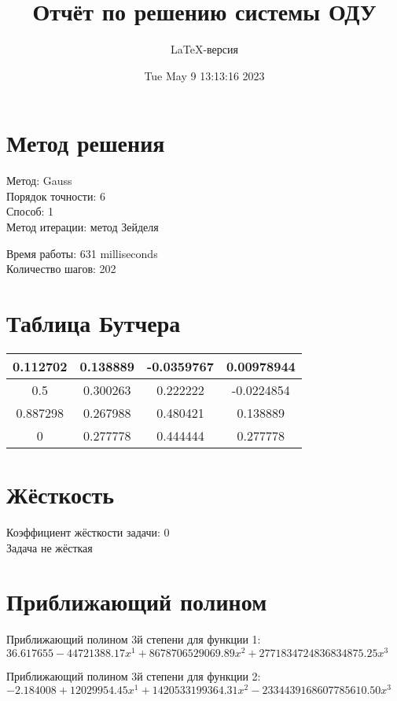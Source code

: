 \documentclass[a4paper,14pt]{extarticle}
\title{Отчёт по решению системы ОДУ}
\author{LaTeX-версия}
\date{Tue May  9 13:13:16 2023}
\begin{document}
\maketitle

\tableofcontents
\pagebreak

\section{Метод решения}

Метод: Gauss\\
Порядок точности: 6\\
Способ: 1\\
Метод итерации: метод Зейделя

Время работы: 631 milliseconds\\
Количество шагов: 202\\
\section{Таблица Бутчера}

\begin{table}[h]
\centering
\begin{tabular}{|c||c|c|c|}
\hline
0.112702 & 0.138889 & -0.0359767 & 0.00978944\\
\hline
0.5 & 0.300263 & 0.222222 & -0.0224854\\
\hline
0.887298 & 0.267988 & 0.480421 & 0.138889\\
\hline
0 & \cellcolor{lightgray} 0.277778 & \cellcolor{lightgray} 0.444444 & \cellcolor{lightgray} 0.277778\\
\hline
\end{tabular}
\end{table}

\section{Жёсткость}

Коэффициент жёсткости задачи: 0\\
Задача не жёсткая

\section{Приближающий полином}

Приближающий полином 3й степени для функции 1: $36.617655 - 44721388.17x^1 + 8678706529069.89x^2 + 2771834724836834875.25x^3$

Приближающий полином 3й степени для функции 2: $-2.184008 + 12029954.45x^1 + 1420533199364.31x^2 - 2334439168607785610.50x^3$
\end{document}
